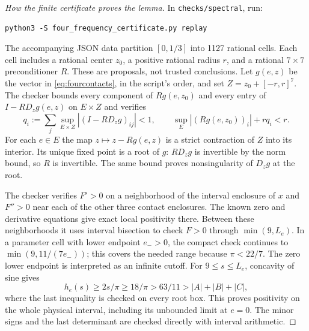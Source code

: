 \begin{proof}[How the finite certificate proves the lemma]
In \texttt{checks/spectral}, run:
\begin{verbatim}
python3 -S four_frequency_certificate.py replay
\end{verbatim}
The accompanying
JSON data partition $[0,1/3]$ into 1127 rational cells. Each cell includes a
rational center $z_0$, a positive rational radius $r$, and a rational
$7\times7$ preconditioner $R$. These are proposals, not trusted conclusions.
Let $g(e,z)$ be the vector in \eqref{eq:fourcontacts}, in the script's order,
and set $Z=z_0+[-r,r]^7$. The checker bounds every component of
$R g(e,z_0)$ and every entry of $I-RD_zg(e,z)$ on $E\times Z$ and verifies
\[
 q_i:=\sum_j\sup_{E\times Z}|(I-RD_zg)_{ij}|<1,
 \qquad
 \sup_E |(Rg(e,z_0))_i|+r q_i<r.
\]
For each $e\in E$ the map $z\mapsto z-Rg(e,z)$ is a strict contraction
of $Z$ into its interior. Its unique fixed point is a root of $g$:
$RD_zg$ is invertible by the norm bound, so $R$ is invertible. The same
bound proves nonsingularity of $D_zg$ at the root.

The checker verifies $F'>0$ on a neighborhood of the interval enclosure of
$x$ and $F''>0$ near each of the other three contact enclosures. The known
zero and derivative equations give exact local positivity there. Between
these neighborhoods it uses interval bisection to check $F>0$ through
$\min(9,L_e)$. In a parameter cell with lower endpoint $e_->0$, the
compact check continues to $\min(9,11/(7e_-))$; this covers the needed range
because $\pi<22/7$. The zero lower endpoint is interpreted as an infinite
cutoff. For $9\le s\le L_e$, concavity of sine gives
\[
 h_e(s)\ge 2s/\pi\ge18/\pi>63/11>|A|+|B|+|C|,
\]
where the last inequality is checked on every root box. This proves positivity
on the whole physical interval, including its unbounded limit at $e=0$.
The minor signs and the last determinant are checked directly with interval
arithmetic.


\end{proof}
